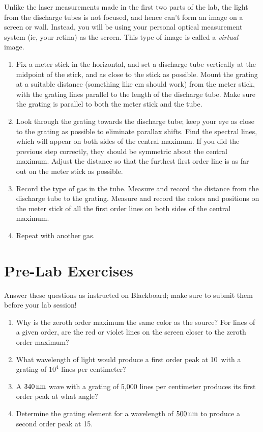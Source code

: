 \documentclass[12pt]{article}
\begin{document}
Unlike the laser measurements made in the first two parts of the lab,
the light from the discharge tubes is not focused, and hence can't
form an image on a screen or wall.  Instead, you will be using your
personal optical measurement system (ie, your retina) as the screen.
This type of image is called a \textit{virtual} image.
\begin{enumerate}
\item Fix a meter stick in the horizontal, and set a discharge tube
  vertically at the midpoint of the stick, and as close to the stick
  as possible.  Mount the grating at a suitable distance (something
  like \unit[50]{cm} should work) from the meter stick, with the
  grating lines parallel to the length of the discharge tube.  Make
  sure the grating is parallel to both the meter stick and the tube.
\item Look through the grating towards the discharge tube; keep your
  eye as close to the grating as possible to eliminate parallax
  shifts.  Find the spectral lines, which will appear on both sides of
  the central maximum.  If you did the previous step correctly, they
  should be symmetric about the central maximum.  Adjust the distance
  so that the furthest first order line is as far out on the meter
  stick as possible.  
\item Record the type of gas in the tube.  Measure and record the
  distance from the discharge tube to the grating.  Measure and record
  the colors and positions on the meter stick of all the first order
  lines on both sides of the central maximum.
\item Repeat with another gas.
\end{enumerate}

\newpage
 
\section*{Pre-Lab Exercises}

Answer these questions as instructed on Blackboard; make sure to
submit them before your lab session!

\begin{enumerate}
\item Why is the zeroth order maximum the same color as the source?
  For lines of a given order, are the red or violet lines on the
  screen closer to the zeroth order maximum?
\item What wavelength of light would produce a first order peak at
  10\textdegree\ with a grating of $10^4$ lines per centimeter?
\item A $\unit[340]{n m}$ wave with a grating of 5,000 lines per
  centimeter produces its first order peak at what angle?
\item Determine the grating element for a wavelength of
  $\unit[500]{n m}$ to produce a second order peak at 15\textdegree.
\end{enumerate}
\end{document}
